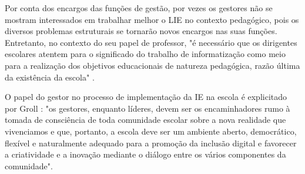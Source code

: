 Por conta dos encargos das funções de gestão, por vezes os gestores não se mostram interessados em trabalhar melhor o LIE no contexto pedagógico, pois os diversos problemas estruturais se tornarão novos encargos nas suas funções. Entretanto, no contexto do seu papel de professor, "é necessário que os dirigentes escolares atentem para o significado do trabalho de informatização como meio para a realização dos objetivos educacionais de natureza pedagógica, razão última da existência da escola" \cite{art:REF_TCC_GROLL}.

O papel do gestor no processo de implementação da IE na escola é explicitado por Groll \cite{art:REF_TCC_GROLL}: "os gestores, enquanto líderes, devem ser os encaminhadores rumo à tomada de consciência de toda comunidade escolar sobre a nova realidade que vivenciamos e que, portanto, a escola deve ser um ambiente aberto, democrático, flexível e naturalmente adequado para a promoção da inclusão digital e favorecer a criatividade e a inovação mediante o diálogo entre os vários componentes da comunidade".

